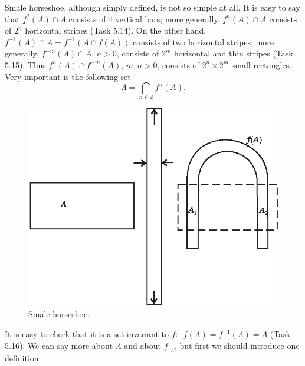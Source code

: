 Smale horseshoe, although simply defined, is not so simple at all. It is easy to say that $f^{2}(A)\cap A$ consists of 4 vertical bars; more generally, $f^{n}(A)\cap A$ consists of $2^{n}$ horizontal stripes (Task 5.14). On the other hand, $f^{-1}(A)\cap A=f^{-1}(A\cap f(A))$ consists of two horizontal stripes; more generally, $f^{-m}(A)\cap A$, $n>0$, consists of $2^{m}$ horizontal and thin stripes (Task 5.15). Thus $f^{n}(A)\cap f^{-m}(A)$, $m,n>0$, consists of $2^{n}\times 2^{m}$ small rectangles. Very important is the following set
\begin{equation}
\label{5.6}
\Lambda =\bigcap_{n\in \mathbb{Z}}f^{n}(A).
\end{equation}

\begin{figure}[!ht]
	\centering
	\includegraphics [scale=1.4]{jtr510}
	\caption{Smale horseshoe.}
	\label{fig:5.10}
\end{figure}

It is easy to check that it is a set invariant to $f:$\ $f(\Lambda )=f^{-1}(\Lambda )=\Lambda $ (Task 5.16). We can say more about $\Lambda $ and about $f|_{\Lambda}$, but first we should introduce one definition.


